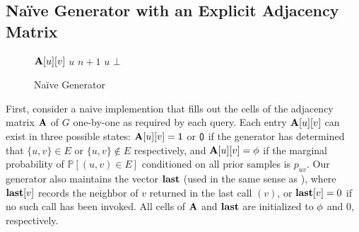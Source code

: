 \subsection{Na\"{i}ve Generator with an Explicit Adjacency Matrix}\label{sec:ER-naive}
\begin{figure}
    \caption{Na\"{i}ve Generator}
    \label{alg:naive}
    \begin{algorithmic}[1]
            \If {$\ADJ[u][v] = \PHI$}
            \EndIf
            \State \Return $\mathbf{A}[u][v]$
        \EndProcedure
                        \State \Return $u$
                \EndIf
            \EndFor
            \State \Return $n+1$
        \EndProcedure
                        \State \Return $u$
                \Else {}
                \EndIf
            \EndWhile
            \State \Return $\bot$
        \EndProcedure
    \end{algorithmic}
\end{figure}

First, consider a naive implemention that fills out the cells of the adjacency matrix $\mathbf{A}$ of $G$ one-by-one as required by each query.
Each entry $\mathbf{A}[u][v]$ can exist in three possible states:
$\mathbf{A}[u][v] = \mathsf{1}$ or $\mathsf{0}$ if the generator has determined that $\{u,v\}\in E$ or $\{u,v\} \notin E$ respectively,
and $\ADJ[u][v] = \PHI$ if the marginal probability of $\mathbb P[(u,v)\in E]$ conditioned on all prior samples is $p_{uv}$.
Our generator also maintains the vector $\mathbf{last}$ (used in the same sense as \cite{reut}),
where $\mathbf{last}[v]$ records the neighbor of $v$ returned in the last call $(v)$, or $\mathbf{last}[v]=0$ if no such call has been invoked.
All cells of $\mathbf{A}$ and $\mathbf{last}$ are initialized to $\phi$ and $0$, respectively.

